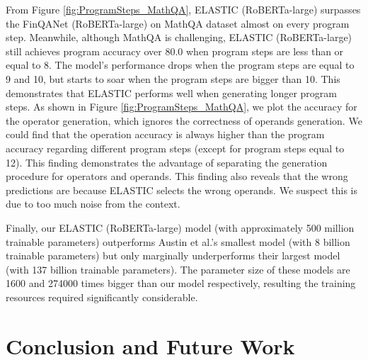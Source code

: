 \documentclass{article}
\begin{document}
From Figure \ref{fig:ProgramSteps_MathQA}, ELASTIC (RoBERTa-large) surpasses the FinQANet (RoBERTa-large) on MathQA dataset almost on every program step. Meanwhile, although MathQA is challenging, ELASTIC (RoBERTa-large) still achieves program accuracy over 80.0 when program steps are less than or equal to 8. The model's performance drops when the program steps are equal to 9 and 10, but starts to soar when the program steps are bigger than 10. This demonstrates that ELASTIC performs well when generating longer program steps. As shown in Figure \ref{fig:ProgramSteps_MathQA}, we plot the accuracy for the operator generation, which ignores the correctness of operands generation. We could find that the operation accuracy is always higher than the program accuracy regarding different program steps (except for program steps equal to 12). This finding demonstrates the advantage of separating the generation procedure for operators and operands. This finding also reveals that the wrong predictions are because ELASTIC selects the wrong operands. We suspect this is due to too much noise from the context. 

Finally, our ELASTIC (RoBERTa-large) model (with approximately 500 million trainable parameters) outperforms Austin et al.'s smallest model \cite{hugeplm} (with 8 billion trainable parameters) but only marginally underperforms their largest model (with 137 billion trainable parameters). The parameter size of these models are 1600 and 274000 times bigger than our model respectively, resulting the training resources required significantly considerable.  


\section{Conclusion and Future Work}
\label{section: conclusion and future work}
\end{document}

